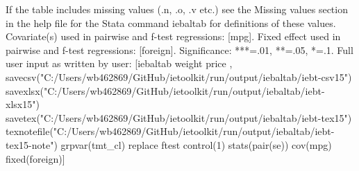 If the table includes missing values (.n, .o, .v etc.) see the Missing values section in the help file for the Stata command iebaltab for definitions of these values. Covariate(s) used in pairwise and f-test regressions: [mpg]. Fixed effect used in pairwise and f-test regressions: [foreign]. Significance: ***=.01, **=.05, *=.1. Full user input as written by user: [iebaltab weight price , savecsv("C:/Users/wb462869/GitHub/ietoolkit/run/output/iebaltab/iebt-csv15") savexlsx("C:/Users/wb462869/GitHub/ietoolkit/run/output/iebaltab/iebt-xlsx15") savetex("C:/Users/wb462869/GitHub/ietoolkit/run/output/iebaltab/iebt-tex15") texnotefile("C:/Users/wb462869/GitHub/ietoolkit/run/output/iebaltab/iebt-tex15-note") grpvar(tmt\_cl) replace ftest control(1) stats(pair(se)) cov(mpg) fixed(foreign)]
